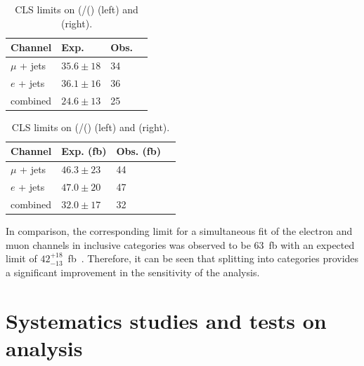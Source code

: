 \begin{table}[ht!]
\centering
\begin{tabular}{| l | l | l | p{1cm} |}
 \hline 
 Channel & Exp.  &Obs. \\
   \hline
 $\mu$ + jets & $35.6\pm 18$ & 34 \\
  \hline
$e$ + jets &  $36.1\pm16$  & 36  \\
\hline
 combined & $24.6\pm13$  & 25   \\
\hline
\end{tabular}
\hspace{0.5cm}
\begin{tabular}{| l | l | l | p{1cm} |}
 \hline 
 Channel & Exp. (fb) &Obs. (fb) \\
   \hline
 $\mu$ + jets & $46.3\pm23$ & 44 \\
  \hline
$e$ + jets &  $47.0\pm20$  & 47  \\
\hline
 combined & $32.0\pm17$  & 32   \\
\hline
\end{tabular}
\caption{CLS limits on (\sigmatttt/(\sigmattttSM) (left) and \sigmatttt (right). }
\label{tab:lims}
\end{table}

In comparison, the corresponding limit for a simultaneous fit of the electron and muon channels in inclusive \njets categories was observed to be 63~fb with an expected limit of  $42^{+18}_{-13}$~fb~\cite{CMS-PAS-TOP-13-012}. Therefore, it can be seen that splitting into \njets categories provides a significant improvement in the sensitivity of the analysis.

\section{Systematics studies and tests on analysis\label{studies8}}

